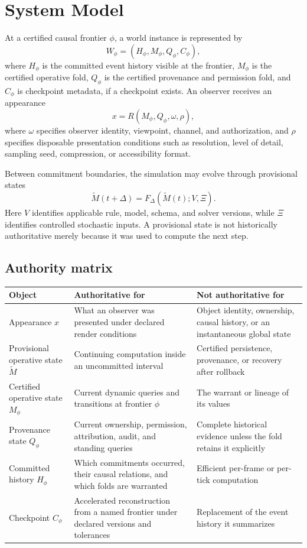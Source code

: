 \documentclass[11pt]{article}
\begin{document}
\section{System Model}

At a certified causal frontier $\phi$, a world instance is represented by
\[
W_{\phi}=(H_{\phi},M_{\phi},Q_{\phi},C_{\phi}),
\]
where $H_{\phi}$ is the committed event history visible at the frontier, $M_{\phi}$ is the certified operative fold, $Q_{\phi}$ is the certified provenance and permission fold, and $C_{\phi}$ is checkpoint metadata, if a checkpoint exists. An observer receives an appearance
\[
x=R(M_{\phi},Q_{\phi},\omega,\rho),
\]
where $\omega$ specifies observer identity, viewpoint, channel, and authorization, and $\rho$ specifies disposable presentation conditions such as resolution, level of detail, sampling seed, compression, or accessibility format.

Between commitment boundaries, the simulation may evolve through provisional states
\[
\widetilde M(t+\Delta)=F_{\Delta}(\widetilde M(t);V,\Xi).
\]
Here $V$ identifies applicable rule, model, schema, and solver versions, while $\Xi$ identifies controlled stochastic inputs. A provisional state is not historically authoritative merely because it was used to compute the next step.

\subsection{Authority matrix}

\begin{longtable}{p{}p{}p{}}
\toprule
Object & Authoritative for & Not authoritative for \\
\midrule
Appearance $x$ & What an observer was presented under declared render conditions & Object identity, ownership, causal history, or an instantaneous global state \\
Provisional operative state $\widetilde M$ & Continuing computation inside an uncommitted interval & Certified persistence, provenance, or recovery after rollback \\
Certified operative state $M_{\phi}$ & Current dynamic queries and transitions at frontier $\phi$ & The warrant or lineage of its values \\
Provenance state $Q_{\phi}$ & Current ownership, permission, attribution, audit, and standing queries & Complete historical evidence unless the fold retains it explicitly \\
Committed history $H_{\phi}$ & Which commitments occurred, their causal relations, and which folds are warranted & Efficient per-frame or per-tick computation \\
Checkpoint $C_{\phi}$ & Accelerated reconstruction from a named frontier under declared versions and tolerances & Replacement of the event history it summarizes \\
\bottomrule
\end{longtable}
\end{document}
